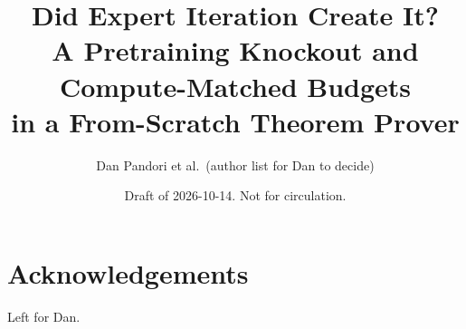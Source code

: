 \documentclass[11pt]{article}
\title{Did Expert Iteration Create It?\\[0.3em]\large A Pretraining Knockout and Compute-Matched Budgets\\in a From-Scratch Theorem Prover}
\author{Dan Pandori et al.\ (author list for Dan to decide)}
\date{Draft of 2026-10-14. Not for circulation.}
\begin{document}
\maketitle

\begin{abstract}

\end{abstract}










\section*{Acknowledgements}
Left for Dan.




\appendix

\end{document}
